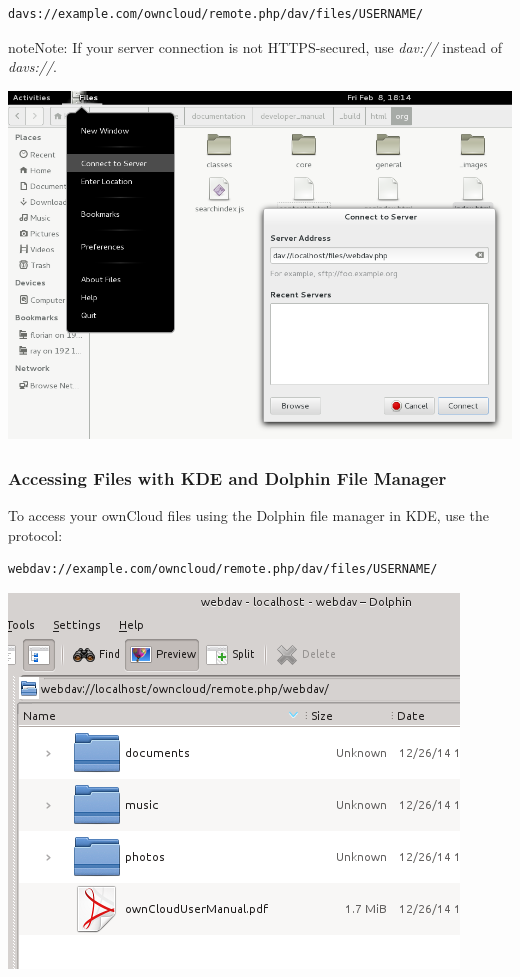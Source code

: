 \documentclass[letterpaper,10pt,english]{sphinxmanual}
\begin{document}
\begin{Verbatim}[commandchars=\\\{\}]
davs://example.com/owncloud/remote.php/dav/files/USERNAME/
\end{Verbatim}

\begin{notice}{note}{Note:}
If your server connection is not HTTPS-secured, use \emph{dav://} instead
of \emph{davs://}.
\end{notice}

\includegraphics{webdav_gnome3_nautilus.png}


\subsubsection{Accessing Files with KDE and Dolphin File Manager}
\label{files/access_webdav:accessing-files-with-kde-and-dolphin-file-manager}
To access your ownCloud files using the Dolphin file manager in KDE, use
the  protocol:

\begin{Verbatim}[commandchars=\\\{\}]
webdav://example.com/owncloud/remote.php/dav/files/USERNAME/
\end{Verbatim}

\includegraphics{webdav_dolphin.png}
\end{document}
